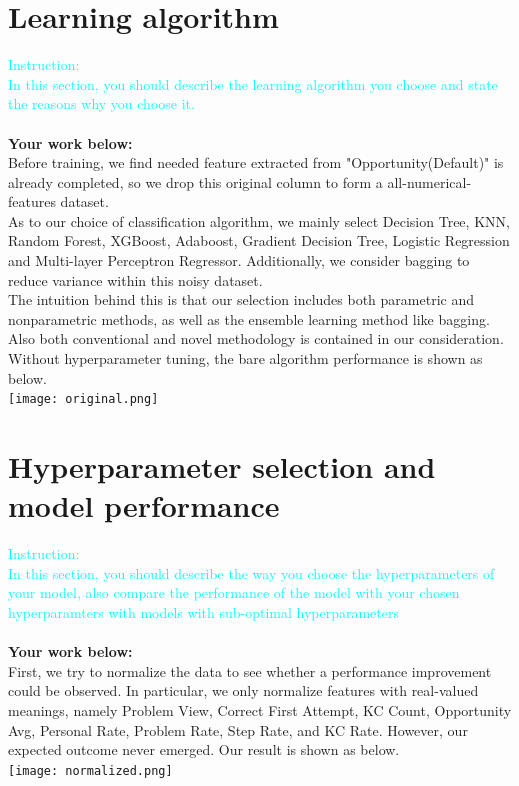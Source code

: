 \documentclass{article}
\begin{document}
\section{Learning algorithm}
\textcolor{cyan}{Instruction: \\
In this section, you should describe the learning algorithm you choose and state the reasons why you choose it.}\\\\
\textbf{Your work below:}\\
Before training, we find needed feature extracted from "Opportunity(Default)" is already completed, so we drop this original column to form a all-numerical-features dataset.\\
As to our choice of classification algorithm, we mainly select Decision Tree, KNN, Random Forest, XGBoost, Adaboost, Gradient Decision Tree,
Logistic Regression and Multi-layer Perceptron Regressor. Additionally, we consider bagging to reduce variance within this noisy dataset.\\
The intuition behind this is that our selection includes both parametric and nonparametric methods, as well as the ensemble learning method like bagging.
Also both conventional and novel methodology is contained in our consideration. \\
Without hyperparameter tuning, the bare algorithm performance is shown as below.\\
\texttt{[image: original.png]}


\section{Hyperparameter selection and model performance}
\textcolor{cyan}{Instruction: \\
In this section, you should describe the way you choose the hyperparameters of your model, also compare the performance of the model with your chosen hyperparamters with models with sub-optimal hyperparameters}\\\\
\textbf{Your work below:}\\
First, we try to normalize the data to see whether a performance improvement could be observed.
In particular, we only normalize features with real-valued meanings, namely Problem View, Correct First Attempt, KC Count, Opportunity Avg, 
Personal Rate, Problem Rate, Step Rate, and KC Rate. However, our expected outcome never emerged. Our result is shown as below.\\
\texttt{[image: normalized.png]}
\end{document}
